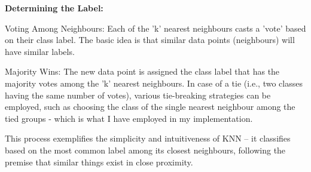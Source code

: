 \documentclass[letterpaper,10pt]{article}
\begin{document}
\textbf{Determining the Label:}

Voting Among Neighbours: Each of the 'k' nearest neighbours casts a 'vote' based on their class label. The basic idea is that similar data points (neighbours) will have similar labels.

Majority Wins: The new data point is assigned the class label that has the majority votes among the 'k' nearest neighbours. In case of a tie (i.e., two classes having the same number of votes), various tie-breaking strategies can be employed, such as choosing the class of the single nearest neighbour among the tied groups - which is what I have employed in my implementation.

This process exemplifies the simplicity and intuitiveness of KNN – it classifies based on the most common label among its closest neighbours, following the premise that similar things exist in close proximity.
\end{document}
